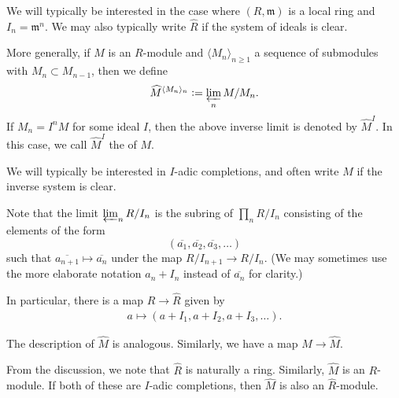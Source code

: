 \documentclass[12pt]{article}
\begin{document}
We will typically be interested in the case where $(R, \mathfrak{m})$ is a local ring and $I_{n} = \mathfrak{m}^{n}$. We may also typically write $\widehat{R}$ if the system of ideals is clear.

\begin{defn}
	More generally, if $M$ is an $R$-module and $\langle M_{n} \rangle_{n \ge 1}$ a sequence of submodules with $M_{n} \subset M_{n - 1}$, then we define
	\begin{equation*} 
		\widehat{M}^{\langle M_{n} \rangle_{n}} \vcentcolon= \varprojlim_{n} M/M_{n}.
	\end{equation*}
	If $M_{n} = I^{n} M$ for some ideal $I$, then the above inverse limit is denoted by $\widehat{M}^{I}$. In this case, we call $\widehat{M}^{I}$ the  of $M$.
\end{defn}

We will typically be interested in $I$-adic completions, and often write $\widehat{M}$ if the inverse system is clear.

Note that the limit $\varprojlim_{n} R/I_{n}$ is the subring of $\prod_{n} R/I_{n}$ consisting of the elements of the form
\begin{equation*} 
	(\overline{a_{1}}, \overline{a_{2}}, \overline{a_{3}}, \ldots)
\end{equation*}
such that $\overline{a_{n + 1}} \mapsto \overline{a_{n}}$ under the map $R/I_{n + 1} \to R/I_{n}$. (We may sometimes use the more elaborate notation $a_{n} + I_{n}$ instead of $\overline{a_{n}}$ for clarity.)

In particular, there is a map $R \to \widehat{R}$ given by
\begin{align*} 
	a \mapsto (a + I_{1}, a + I_{2}, a + I_{3}, \ldots).
\end{align*}

The description of $\widehat{M}$ is analogous. Similarly, we have a map $M \to \widehat{M}$.

\begin{rem}
	From the discussion, we note that $\widehat{R}$ is naturally a ring. Similarly, $\widehat{M}$ is an $R$-module. If both of these are $I$-adic completions, then $\widehat{M}$ is also an $\widehat{R}$-module.
\end{rem}
\end{document}
